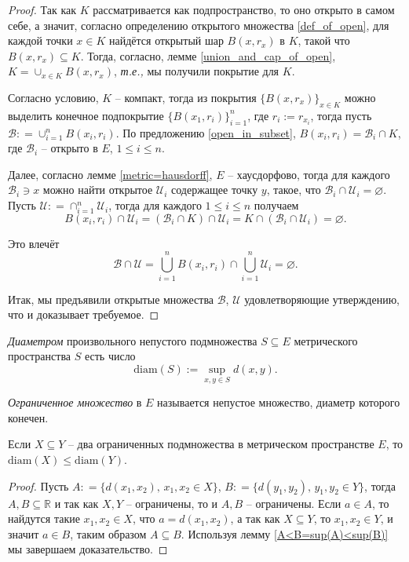 \begin{proof}
    Так как $K$ рассматривается как подпространство, то оно открыто в самом себе, а значит, согласно определению открытого множества \ref{def_of_open}, для каждой точки $x\in K$ найдётся открытый шар $B(x,r_x)$ в $K$, такой что $B(x,r_x) \subseteq K$. Тогда, согласно, лемме \ref{union_and_cap_of_open}, $K = \cup_{x \in K}B(x,r_x)$, \textit{т.е.,} мы получили покрытие для $K$.

    Согласно условию, $K$ -- компакт, тогда из покрытия $\{B(x,r_x)\}_{x\in K}$ можно выделить конечное подпокрытие $\{B(x_1, r_i)\}_{i=1}^n$, где $r_i:= r_{x_i}$, тогда пусть $\mathscr{B}: = \cup_{i=1}^n B(x_i,r_i)$. По предложению \ref{open_in_subset}, $B(x_i,r_i) = \mathscr{B}_i \cap K$, где $\mathscr{B}_i$ -- открыто в $E$, $1 \le i \le n$.

    Далее, согласно лемме \ref{metric=hausdorff}, $E$ -- хаусдорфово, тогда для каждого $\mathscr{B}_i \ni x$ можно найти открытое $\mathscr{U}_i$ содержащее точку $y$, такое, что $\mathscr{B}_i \cap \mathscr{U}_i = \varnothing$. Пусть $\mathscr{U}: = \cap_{i=1}^n \mathscr{U}_i$, тогда для каждого $1 \le i \le n$ получаем
   \[
    B(x_i,r_i) \cap \mathscr{U}_i = \left( \mathscr{B}_i \cap K \right) \cap \mathscr{U}_i = K \cap (\mathscr{B}_i \cap \mathscr{U}_i) = \varnothing.
   \]

   Это влечёт
   \[
    \mathscr{B} \cap \mathscr{U}= \bigcup_{i=1}^n B(x_i,r_i) \cap \bigcup_{i=1}^n \mathscr{U}_i = \varnothing.
   \]

   Итак, мы предъявили открытые множества $\mathscr{B}$, $\mathscr{U}$ удовлетворяющие утверждению, что и доказывает требуемое.
\end{proof}

\begin{definition}
    \textit{Диаметром} произвольного непустого подмножества $S \subseteq E$ метрического пространства $S$ есть число 
    \[
     \mathrm{diam}(S):= \sup_{x,y \in S} d(x,y).
    \]

    \textit{Ограниченное множество } в $E$ называется непустое множество, диаметр которого конечен.
\end{definition}

\begin{lemma}\label{X<Y=>diam(X)<diam(Y)}
    Если $X\subseteq Y$ -- два ограниченных подмножества в метрическом пространстве $E$, то $\mathrm{diam}(X) \le \mathrm{diam}(Y)$.
\end{lemma}

\begin{proof}
    Пусть $A: = \{d(x_1,x_2),\, x_1,x_2 \in X\}$, $B: = \{d(y_1,y_2), \, y_1,y_2 \in Y\}$, тогда $A,B \subseteq \mathbb{R}$ и так как $X,Y$ -- ограничены, то и $A,B$ -- ограничены. Если $a \in A$, то найдутся такие $x_1,x_2 \in X$, что $a = d(x_1,x_2)$, а так как $X \subseteq Y$, то $x_1,x_2 \in Y$, и значит $a\in B$, таким образом $A \subseteq B$. Используя лемму \ref{A<B=sup(A)<sup(B)} мы завершаем доказательство.
\end{proof}




